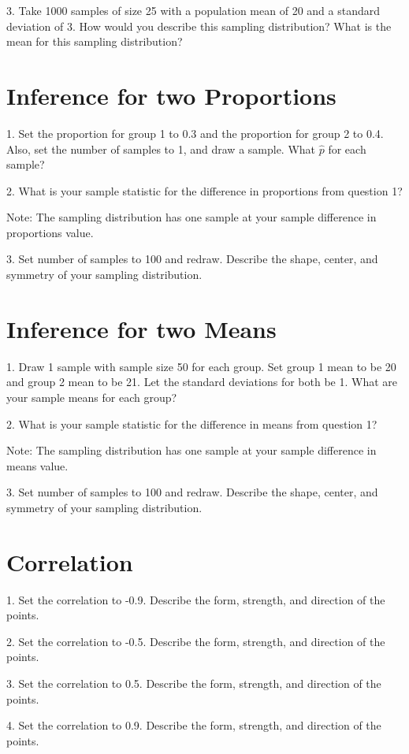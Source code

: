 \documentclass[11pt]{amsart}
\begin{document}
3. Take 1000 samples of size 25 with a population mean of 20 and a standard deviation of 3.  How would you describe this sampling distribution? What is the mean for this sampling distribution?


\section{Inference for two Proportions}

1. Set the proportion for group 1 to 0.3 and the proportion for group 2 to 0.4. Also, set the number of samples to 1, and draw a sample. What $\hat{p}$ for each sample? 

2. What is your sample statistic for the difference in proportions from question 1?

Note: The sampling distribution has one sample at your sample difference in proportions value.

3. Set number of samples to 100 and redraw. Describe the shape, center, and symmetry of your sampling distribution. 


\section{Inference for two Means}
1. Draw 1 sample with sample size 50 for each group. Set group 1 mean to be 20 and group 2 mean to be 21.  Let the standard deviations for both be 1. What are your sample means for each group?

2. What is your sample statistic for the difference in means from question 1?


Note: The sampling distribution has one sample at your sample difference in means value.

3. Set number of samples to 100 and redraw. Describe the shape, center, and symmetry of your sampling distribution. 




\section{Correlation}
1. Set the correlation to -0.9. Describe the form, strength, and direction of the points.

2. Set the correlation to -0.5. Describe the form, strength, and direction of the points.

3. Set the correlation to 0.5. Describe the form, strength, and direction of the points.

4. Set the correlation to 0.9. Describe the form, strength, and direction of the points.
\end{document}
